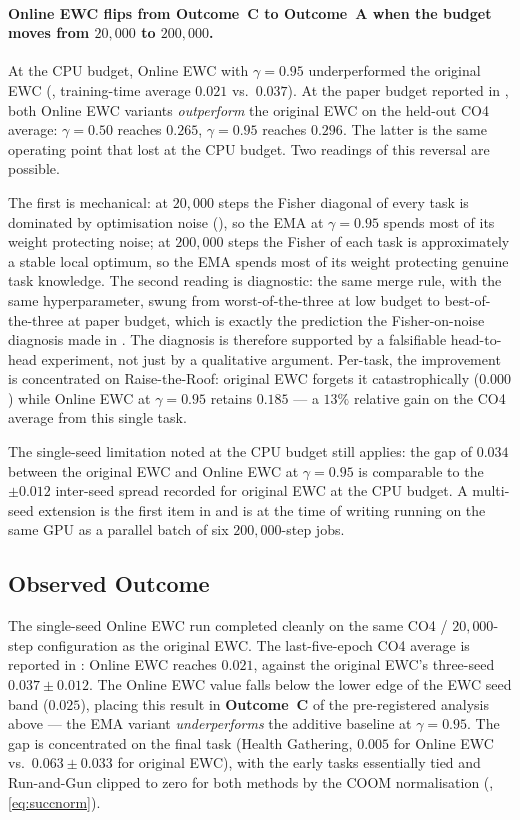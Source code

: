 \paragraph{Online EWC flips from Outcome~C to Outcome~A
when the budget moves from $20{,}000$ to $200{,}000$.}
At the CPU budget, Online EWC with $\gamma = 0.95$
underperformed the original EWC
(, training-time average
$0.021$ vs.\ $0.037$). At the paper budget reported in
, both Online EWC variants
\emph{outperform} the original EWC on the held-out CO4
average: $\gamma = 0.50$ reaches $0.265$, $\gamma = 0.95$
reaches $0.296$. The latter is the same operating point
that lost at the CPU budget. Two readings of this reversal
are possible.

The first is mechanical: at $20{,}000$ steps the Fisher
diagonal of every task is dominated by optimisation noise
(), so the EMA at $\gamma = 0.95$
spends most of its weight protecting noise; at $200{,}000$
steps the Fisher of each task is approximately a stable
local optimum, so the EMA spends most of its weight
protecting genuine task knowledge. The second reading is
diagnostic: the same merge rule, with the same
hyperparameter, swung from worst-of-the-three at low
budget to best-of-the-three at paper budget, which is
exactly the prediction the Fisher-on-noise diagnosis made
in . The diagnosis is therefore
supported by a falsifiable head-to-head experiment, not
just by a qualitative argument. Per-task, the improvement
is concentrated on Raise-the-Roof: original EWC forgets it
catastrophically ($0.000$) while Online EWC at
$\gamma = 0.95$ retains $0.185$ --- a $13\%$ relative
gain on the CO4 average from this single task.

The single-seed limitation noted at the CPU budget still
applies: the gap of $0.034$ between the original EWC and
Online EWC at $\gamma = 0.95$ is comparable to the
${\pm} 0.012$ inter-seed spread recorded for original EWC
at the CPU budget. A multi-seed extension is the first
item in  and is at the time of writing
running on the same GPU as a parallel batch of six
$200{,}000$-step jobs.

\subsection{Observed Outcome}
\label{sec:ewc_online_outcome}

The single-seed Online EWC run completed cleanly on the same
CO4 / $20{,}000$-step configuration as the original EWC. The
last-five-epoch CO4 average is reported in
: Online EWC reaches $0.021$, against
the original EWC's three-seed $0.037 {\pm} 0.012$. The
Online EWC value falls below the lower edge of the EWC seed
band ($0.025$), placing this result in
\textbf{Outcome~C} of the pre-registered analysis above ---
the EMA variant \emph{underperforms} the additive baseline
at $\gamma = 0.95$. The gap is concentrated on the final
task (Health Gathering, $0.005$ for Online EWC vs.\
$0.063 {\pm} 0.033$ for original EWC), with the early
tasks essentially tied and Run-and-Gun clipped to zero for
both methods by the COOM normalisation
(, \cref{eq:succnorm}).

